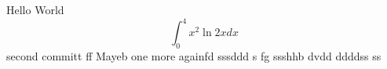 \documentclass{article}
\begin{document}
Hello World
$$\int_0^4 x^2 \ln{2x}dx$$
second committ  ff
Mayeb
one more
againfd
sssddd
s fg
ssshhb dvdd ddddss ss
\end{document}
